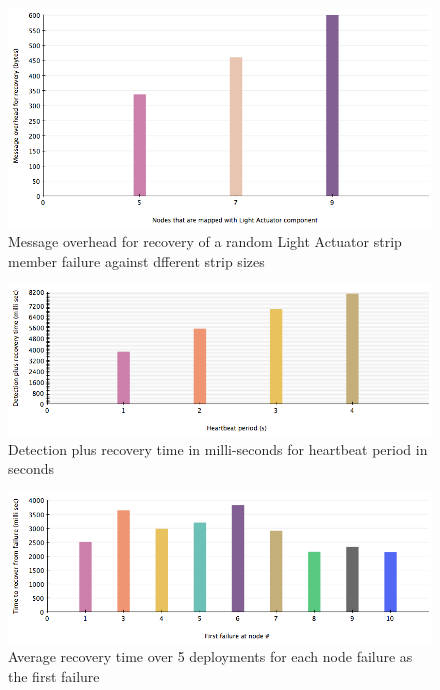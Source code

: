 \begin{figure}[h!]
\centering
    \includegraphics[width=\linewidth]{figures/results-message-overhead-vs-strip-size}
\caption{Message overhead for recovery of a random Light Actuator strip member failure against dfferent strip sizes}
\label{fig:results-message-overhead-vs-strip-size}
\end{figure}

\begin{figure}[h!]
\centering
    \includegraphics[width=\linewidth]{figures/results-heartbeat-vs-detection-recovery-time}
\caption{Detection plus recovery time in milli-seconds for heartbeat period in seconds}
\label{fig:results-heartbeat-vs-detection-recovery-time}
\end{figure}

\begin{figure}[h!]
\centering
    \includegraphics[width=\linewidth]{figures/results-average-recovery-time-plus-message-overhead}
\caption{Average recovery time over 5 deployments for each node failure as the first failure}
\label{fig:results}
\end{figure}


